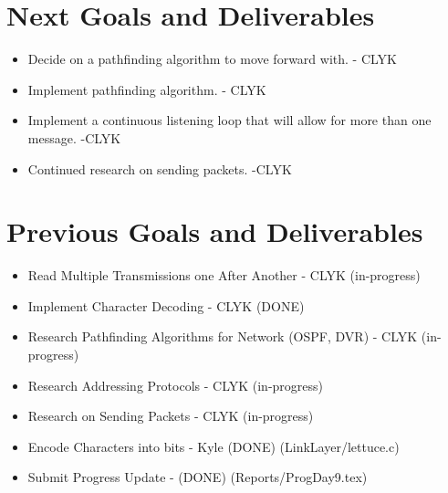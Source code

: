 \documentclass{article}
\begin{document}
\section*{Next Goals and Deliverables}
\begin{itemize}
\item Decide on a pathfinding algorithm to move forward with. - CLYK
\item Implement pathfinding algorithm. - CLYK
\item Implement a continuous listening loop that will allow for more than one message. -CLYK
\item Continued research on sending packets. -CLYK

\end{itemize}
\section*{Previous Goals and Deliverables}
\begin{itemize}

\item Read Multiple Transmissions one After Another - CLYK (in-progress)
\item Implement Character Decoding - CLYK (DONE)
\item Research Pathfinding Algorithms for Network (OSPF, DVR) - CLYK (in-progress)
\item Research Addressing Protocols - CLYK (in-progress)
\item Research on Sending Packets - CLYK (in-progress)
\item Encode Characters into bits - Kyle  (DONE) (LinkLayer/lettuce.c)
\item Submit Progress Update - (DONE) (Reports/ProgDay9.tex)
\end{itemize}
\end{document}
